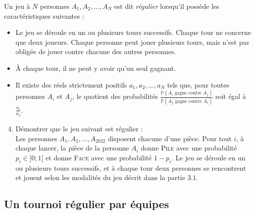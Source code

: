 \documentclass[landscape,twocolumn,leqno,a4paper,10pt]{report} %
\newcommand\n{\noindent}
\begin{document}
\n Un jeu à $N$ personnes $A_{1}, A_{2}, \ldots, A_{N}$ est dit \textit{régulier} lorsqu'il possède les caractéristiques suivantes :
\begin{itemize}
	\item[$\triangleright$] Le jeu se déroule en un ou plusieurs tours successifs. Chaque tour ne concerne que deux joueurs. Chaque personne peut jouer plusieurs tours, mais n'est pas obligée de jouer contre chacune des autres personnes.
	\item[$\triangleright$] À chaque tour, il ne peut y avoir qu'un seul gagnant.
	\item[$\triangleright$] Il existe des réels strictement positifs $a_{1}, a_{2}, \ldots, a_{N}$ tels que, pour toutes personnes $A_{i}$ et $A_{j}$, le quotient des probabilités $\frac{\mathbb{P}\left(A_{i} \text { gagne contre } A_{j}\right)}{\mathbb{P}\left(A_{j} \text { gagne contre } A_{i}\right)}$ soit égal à $\frac{a_{i}}{a_{j}}$.
\end{itemize}

\vspace{-0.2cm}
\begin{enumerate}\setcounter{enumi}{3}
	\item Démontrer que le jeu suivant est régulier :\\
	Les personnes $A_{1}, A_{2}, \ldots, A_{2022}$ disposent chacune d'une pièce. Pour tout $i$, à chaque lancer, la pièce de la personne $A_{i}$ donne \textsc{Pile} avec une probabilité $p_{i} \in ] 0 ; 1 [$ et donne \textsc{Face} avec une probabilité $1-p_{i}$. Le jeu se déroule en un ou plusieurs tours successifs, et à chaque tour deux personnes se rencontrent et jouent selon les modalités du jeu décrit dans la partie $3.1$.
\end{enumerate}


\subsection{Un tournoi régulier par équipes}
 
\end{document}
